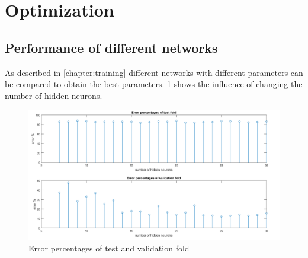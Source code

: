 \section{Optimization} \label {chapter:optimization}

\subsection{Performance of different networks}
As described in \cref{chapter:training} different networks with different parameters can be compared to obtain the best parameters. \cref{test_val_error} shows the influence of changing the number of hidden neurons.

\begin{figure}[!h]
\begin{center}
\includegraphics[width=16cm]{testresults/errorpercentages.png}
\caption{Error percentages of test and validation fold }
\label{test_val_error}
\end{center}
\end{figure}
